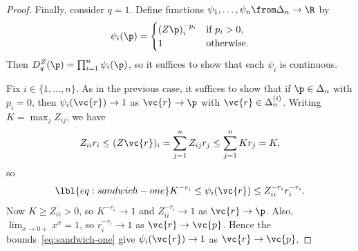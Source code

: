 \begin{proof}
Finally, consider $q = 1$.  Define functions $\psi_1, \ldots, \psi_n \from
\Delta_n \to \R$ by
\[
\psi_i(\p) =
\begin{cases}
(Z\p)_i^{-p_i}          &\text{if } p_i > 0,    \\
1                       &\text{otherwise}.
\end{cases}
\]
Then $D_q^Z(\p) = \prod_{i = 1}^n \psi_i(\p)$, so it suffices to show that
each $\psi_i$ is continuous.

Fix $i \in \{1, \ldots, n\}$.  As in the
previous case, it suffices to show that if $\p \in \Delta_n$ with $p_i =
0$, then $\psi_i(\vc{r}) \to 1$ as $\vc{r} \to \p$ with $\vc{r} \in
\Delta_n^{(i)}$.  Writing $K = \max_j Z_{ij}$, we have
\[
Z_{ii} r_i
\leq 
(Z\vc{r})_i 
=
\sum_{j = 1}^n Z_{ij} r_j
\leq
\sum_{j = 1}^n K r_j
=
K,
\]
so
% 
\begin{equation}
\lbl{eq:sandwich-one}
K^{-r_i}
\leq
\psi_i(\vc{r})
\leq 
Z_{ii}^{-r_i} r_i^{-r_i}.
\end{equation}
% 
Now $K \geq Z_{ii} > 0$, so $K^{-r_i} \to 1$ and $Z_{ii}^{-r_i} \to 1$ as
$\vc{r} \to \p$.  Also, $\lim_{x \to 0+} x^x = 1$, so $r_i^{-r_i} \to 1$ as
$\vc{r} \to \vc{p}$.  Hence the bounds~\eqref{eq:sandwich-one} give
$\psi_i(\vc{r}) \to 1$ as $\vc{r} \to \vc{p}$.
\end{proof}

